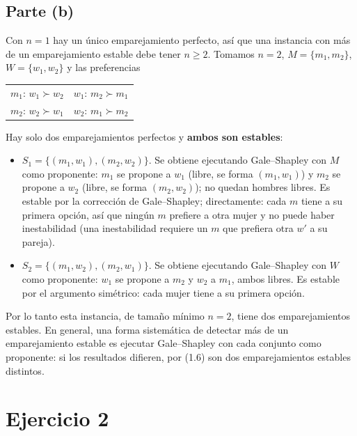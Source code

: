 \subsection*{Parte (b)}
Con $n=1$ hay un único emparejamiento perfecto, así que una instancia con más de un
emparejamiento estable debe tener $n\ge 2$. Tomamos $n=2$, $M=\{m_1,m_2\}$,
$W=\{w_1,w_2\}$ y las preferencias
\begin{center}
\begin{tabular}{l@{\qquad}l}
$m_1$: $w_1 \succ w_2$ & $w_1$: $m_2 \succ m_1$\\
$m_2$: $w_2 \succ w_1$ & $w_2$: $m_1 \succ m_2$
\end{tabular}
\end{center}
Hay solo dos emparejamientos perfectos y \textbf{ambos son estables}:
\begin{itemize}
  \item $S_1=\{(m_1,w_1),(m_2,w_2)\}$. Se obtiene ejecutando Gale--Shapley con $M$ como
        proponente: $m_1$ se propone a $w_1$ (libre, se forma $(m_1,w_1)$) y $m_2$ se propone a
        $w_2$ (libre, se forma $(m_2,w_2)$); no quedan hombres libres. Es estable por la
        corrección de Gale--Shapley; directamente: cada $m$ tiene a su primera opción, así que
        ningún $m$ prefiere a otra mujer y no puede haber inestabilidad (una inestabilidad requiere
        un $m$ que prefiera otra $w'$ a su pareja).
  \item $S_2=\{(m_1,w_2),(m_2,w_1)\}$. Se obtiene ejecutando Gale--Shapley con $W$ como
        proponente: $w_1$ se propone a $m_2$ y $w_2$ a $m_1$, ambos libres. Es estable por el
        argumento simétrico: cada mujer tiene a su primera opción.
\end{itemize}
Por lo tanto esta instancia, de tamaño mínimo $n=2$, tiene dos emparejamientos estables. En
general, una forma sistemática de detectar más de un emparejamiento estable es ejecutar
Gale--Shapley con cada conjunto como proponente: si los resultados difieren, por (1.6) son dos
emparejamientos estables distintos.

\section{Ejercicio 2}

